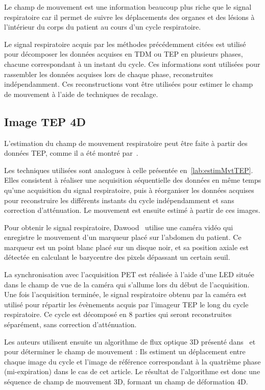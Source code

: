 Le champ de mouvement est une information beaucoup plus riche que le signal respiratoire car il permet de suivre les déplacements des organes et des lésions à l'intérieur du corps du patient au cours d'un cycle respiratoire.

Le signal respiratoire acquis par les méthodes précédemment citées est utilisé pour décomposer les données acquises en TDM ou TEP en plusieurs phases, chacune correspondant à un instant du cycle. Ces informations sont utilisées pour rassembler les données acquises lors de chaque phase, reconstruites indépendamment. Ces reconstructions vont être utilisées pour estimer le champ de mouvement à l'aide de techniques de recalage.


\subsection{Image TEP 4D}
\label{lab:estimMvtTEP4D}
L'estimation du champ de mouvement respiratoire peut être faite à partir des données TEP, comme il a été montré par~\cite{dawood2008respiratory, dawood2006lung}. 

Les techniques utilisées sont analogues à celle présentée en~\ref{lab:estimMvtTEP}. Elles consistent à réaliser une acquisition séquentielle des données en même temps qu'une acquisition du signal respiratoire, puis à réorganiser les données acquises pour reconstruire les différents instants du cycle indépendamment et sans correction d'atténuation. Le mouvement est ensuite estimé à partir de ces images.

Pour obtenir le signal respiratoire, Dawood~\cite{dawood2008respiratory} utilise une caméra vidéo qui enregistre le mouvement d'un marqueur placé sur l'abdomen du patient. Ce marqueur est un point blanc placé sur un disque noir, et sa position axiale est détectée en calculant le barycentre des pixels dépassant un certain seuil. 

La synchronisation avec l'acquisition PET est réalisée à l'aide d'une LED située dans le champ de vue de la caméra qui s'allume lors du début de l'acquisition. Une fois l'acquisition terminée, le signal respiratoire obtenu par la caméra est utilisé pour répartir les évènements acquis par l'imageur TEP le long du cycle respiratoire. Ce cycle est décomposé en 8 parties qui seront reconstruites séparément, sans correction d'atténuation.

Les auteurs utilisent ensuite un algorithme de flux optique 3D présenté dans~\cite{dawood2006lung} et~\cite{horn1981determining} pour déterminer le champ de mouvement : Ils estiment un déplacement entre chaque image du cycle et l'image de référence correspondant à la quatrième phase (mi-expiration) dans le cas de cet article. Le résultat de l'algorithme est donc une séquence de champ de mouvement 3D,  formant un champ de déformation 4D.

